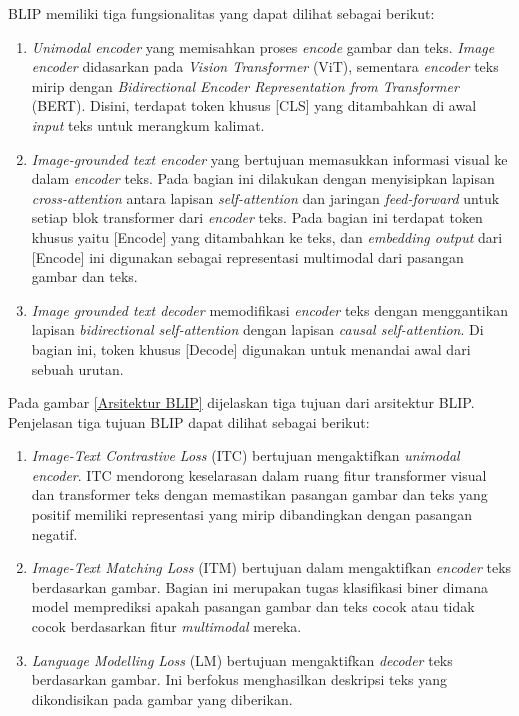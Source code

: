 \par BLIP memiliki tiga fungsionalitas yang dapat dilihat sebagai berikut:

\begin{enumerate}

    \item{\textit{Unimodal encoder} yang memisahkan proses \textit{encode} gambar dan teks. \textit{Image encoder} didasarkan pada \textit{Vision Transformer} (ViT), sementara \textit{encoder} teks mirip dengan \textit{Bidirectional Encoder Representation from Transformer} (BERT). Disini, terdapat token khusus [CLS] yang ditambahkan di awal \textit{input} teks untuk merangkum kalimat.}

    \item{\textit{Image-grounded text encoder} yang bertujuan memasukkan informasi visual ke dalam \textit{encoder} teks. Pada bagian ini dilakukan dengan menyisipkan lapisan \textit{cross-attention} antara lapisan \textit{self-attention} dan jaringan \textit{feed-forward} untuk setiap blok transformer dari \textit{encoder} teks. Pada bagian ini terdapat token khusus yaitu [Encode] yang ditambahkan ke teks, dan \textit{embedding output} dari [Encode] ini digunakan sebagai representasi multimodal dari pasangan gambar dan teks.}

    \item{\textit{Image grounded text decoder} memodifikasi \textit{encoder} teks dengan menggantikan lapisan \textit{bidirectional self-attention} dengan lapisan \textit{causal self-attention}. Di bagian ini, token khusus [Decode] digunakan untuk menandai awal dari sebuah urutan.}

\end{enumerate}

\par Pada gambar \ref{Arsitektur BLIP} dijelaskan tiga tujuan dari arsitektur BLIP. Penjelasan tiga tujuan BLIP dapat dilihat sebagai berikut:

\begin{enumerate}
    \item{\textit{Image-Text Contrastive Loss} (ITC) bertujuan mengaktifkan \textit{unimodal encoder}. ITC mendorong keselarasan dalam ruang fitur transformer visual dan transformer teks dengan memastikan pasangan gambar dan teks yang positif memiliki representasi yang mirip dibandingkan dengan pasangan negatif.}

    \item{\textit{Image-Text Matching Loss} (ITM) bertujuan dalam mengaktifkan \textit{encoder} teks berdasarkan gambar. Bagian ini merupakan tugas klasifikasi biner dimana model memprediksi apakah pasangan gambar dan teks cocok atau tidak cocok berdasarkan fitur \textit{multimodal} mereka.}

    \item{\textit{Language Modelling Loss} (LM) bertujuan mengaktifkan \textit{decoder} teks berdasarkan gambar. Ini berfokus menghasilkan deskripsi teks yang dikondisikan pada gambar yang diberikan.}


\end{enumerate}

